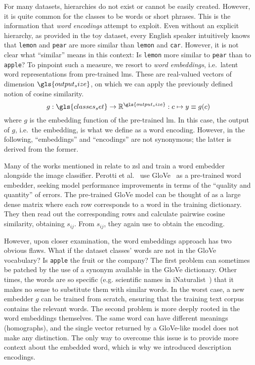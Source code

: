 For many datasets, hierarchies do not exist or cannot be easily created. However, it is quite common for the classes to be words or short phrases. This is the information that \emph{word encodings} attempt to exploit. Even without an explicit hierarchy, as provided in the toy dataset, every English speaker intuitively knows that \texttt{lemon} and \texttt{pear} are more similar than \texttt{lemon} and \texttt{car}.
However, it is not clear what ``similar'' means in this context: Is \texttt{lemon} more similar to \texttt{pear} than to \texttt{apple}? To pinpoint such a measure, we resort to \emph{word embeddings}, i.e.\ latent word representations from pre-trained \acrshort{lm}s. These are real-valued vectors of dimension $\gls{output_size}$, on which we can apply the previously defined notion of cosine similarity.
\begin{equation}
  g : \gls{classes_set} \to \mathbb{R}^{\gls{output_size}} :
  c \mapsto y \equiv g(c)
  \label{eq:word-encoding}
\end{equation}
where $g$ is the embedding function of the pre-trained \acrshort{lm}.
In this case, the output of $g$, i.e.\ the embedding, is what we define as a word encoding. However, in the following, ``embeddings'' and ``encodings'' are not synonymous; the latter is derived from the former.

Many of the works mentioned in  relate to \acrshort{zsl} and train a word embedder alongside the image classifier.
Perotti et al.~\cite{BeyondOneHotPerott2023} use GloVe~\cite{GloveGlobalVPennin2014} as a pre-trained word embedder, seeking model performance improvements in terms of the ``quality and quantity'' of errors. The pre-trained GloVe model can be thought of as a large dense matrix where each row corresponds to a word in the training dictionary. They then read out the corresponding rows and calculate pairwise cosine similarity, obtaining $s_{ij}$. From $s_{ij}$, they again use  to obtain the encoding.

However, upon closer examination, the word embeddings approach has two obvious flaws.
What if the dataset classes' words are not in the GloVe vocabulary?
Is \texttt{apple} the fruit or the company?
The first problem can sometimes be patched by the use of a synonym available in the GloVe dictionary. Other times, the words are so specific (e.g. scientific names in iNaturalist~\cite{TheInaturalistHorn2017}) that it makes no sense to substitute them with similar words. In the worst case, a new embedder $g$ can be trained from scratch, ensuring that the training text corpus contains the relevant words.
The second problem is more deeply rooted in the word embeddings themselves. The same word can have different meanings (homographs), and the single vector returned by a GloVe-like model does not make any distinction. The only way to overcome this issue is to provide more context about the embedded word, which is why we introduced description encodings.

